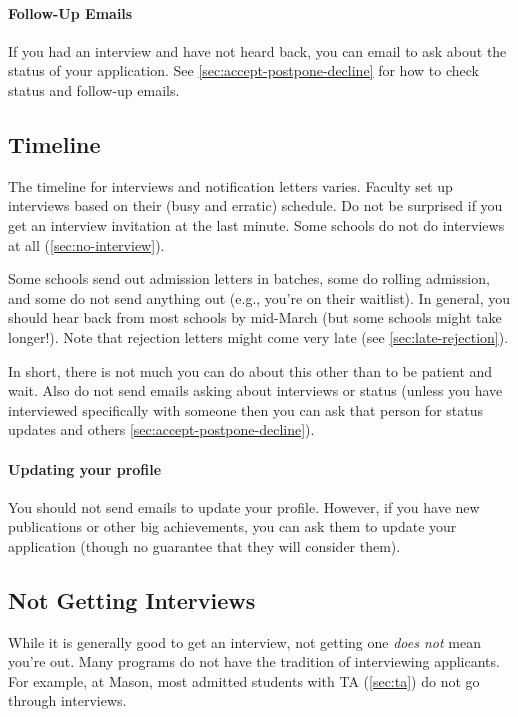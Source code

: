 \documentclass[oneside,11pt,dvipsnames]{book}
\begin{document}
\paragraph{Follow-Up Emails} If you had an interview and have not heard back, you can email to ask about the status of your application. See \autoref{sec:accept-postpone-decline} for how to check status and follow-up emails.

\subsection{Timeline} 

The timeline for interviews and notification letters varies.  Faculty set up interviews based on their (busy and erratic) schedule. Do not be surprised if you get an interview invitation at the last minute. Some schools do not do interviews at all (\autoref{sec:no-interview}).

Some schools send out admission letters in batches, some do rolling admission, and some do not send anything out (e.g., you're on their waitlist).  In general, you should hear back from most schools by mid-March (but some schools might take longer!). Note that rejection letters might come very late (see \autoref{sec:late-rejection}).

In short, there is not much you can do about this other than to be patient and wait. Also do not send emails asking about interviews or status (unless you have interviewed specifically with someone then you can ask that person for status updates and others \autoref{sec:accept-postpone-decline}).

\paragraph{Updating your profile} You should not send emails to update your profile.  However, if you have new publications or other big achievements, you can ask them to update your application (though no guarantee that they will consider them).

\subsection{Not Getting Interviews}\label{sec:no-interview}
While it is generally good to get an interview, not getting one \emph{does not} mean you're out.  Many programs do not have the tradition of interviewing applicants. For example, at Mason, most admitted students with TA (\autoref{sec:ta}) do not go through interviews.
\end{document}
